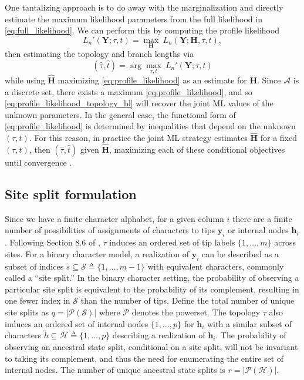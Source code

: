 \documentclass[a4paper]{article}
\newcommand{\alphabet}{\mathcal{A}}
\newcommand{\fullAlignment}{\mathbf{Y}}
\newcommand{\alignmentColumn}{\mathbf{y}}
\newcommand{\siteSplit}{\tilde{s}}
\newcommand{\siteSplitSet}{\mathcal{S}}
\newcommand{\fullAncestralStates}{\mathbf{H}}
\newcommand{\ancestralStateColumn}{\mathbf{h}}
\newcommand{\ancestralSplit}{\tilde{h}}
\newcommand{\ancestralSplitSet}{\mathcal{H}}
\newcommand{\nCols}{n}
\newcommand{\nSiteRows}{m}
\newcommand{\nAncestralStateRows}{p}
\newcommand{\nSiteSplits}{q}
\newcommand{\nAncestralSplits}{r}
\begin{document}
One tantalizing approach is to do away with the marginalization and directly estimate the maximum likelihood parameters from the full likelihood in \eqref{eq:full_likelihood}.
We can perform this by computing the profile likelihood
\begin{equation}
\label{eq:profile_likelihood}
L_\nCols'(\fullAlignment;\tau, t) = \max_{\fullAncestralStates} \ L_\nCols(\fullAlignment;\fullAncestralStates, \tau, t),
\end{equation}
then estimating the topology and branch lengths via
\begin{equation}
\label{eq:profile_likelihood_topology_bl}
(\hat{\tau}, \hat{t}) = \arg\max_{\tau, t} \ L_\nCols'(\fullAlignment;\tau, t)
\end{equation}
while using $\hat{\fullAncestralStates}$ maximizing \eqref{eq:profile_likelihood} as an estimate for $\fullAncestralStates$.
Since $\alphabet$ is a discrete set, there exists a maximum \eqref{eq:profile_likelihood}, and so \eqref{eq:profile_likelihood_topology_bl} will recover the joint ML values of the unknown parameters.
In the general case, the functional form of \eqref{eq:profile_likelihood} is determined by inequalities that depend on the unknown $(\tau,t)$.
For this reason, in practice the joint ML strategy estimates $\hat{\fullAncestralStates}$ for a fixed $(\tau,t)$, then $(\hat{\tau},\hat{t})$ given $\hat{\fullAncestralStates}$, maximizing each of these conditional objectives until convergence \cite{Neher2017}.

\subsection{Site split formulation}

Since we have a finite character alphabet, for a given column $i$ there are a finite number of possibilities of assignments of characters to tips $\alignmentColumn_i$ or internal nodes $\ancestralStateColumn_i$.
Following Section 8.6 of \cite{Semple2003-em}, $\tau$ induces an ordered set of tip labels $\{1,\ldots,\nSiteRows\}$ across sites.
For a binary character model, a realization of $\alignmentColumn_i$ can be described as a subset of indices $\siteSplit\subseteq\siteSplitSet\triangleq\{1,\ldots,\nSiteRows-1\}$ with equivalent characters, commonly called a ``site split.''
In the binary character setting, the probability of observing a particular site split is equivalent to the probability of its complement, resulting in one fewer index in $\siteSplitSet$ than the number of tips.
Define the total number of unique site splits as $\nSiteSplits=|\mathcal{P}(\siteSplitSet)|$ where $\mathcal{P}$ denotes the powerset.
The topology $\tau$ also induces an ordered set of internal nodes $\{1,\ldots,\nAncestralStateRows\}$ for $\ancestralStateColumn_i$ with a similar subset of characters $\ancestralSplit\subseteq\ancestralSplitSet\triangleq\{1,\ldots,\nAncestralStateRows\}$ describing a realization of $\ancestralStateColumn_i$.
The probability of observing an ancestral state split, conditional on a site split, will not be invariant to taking its complement, and thus the need for enumerating the entire set of internal nodes.
The number of unique ancestral state splits is $\nAncestralSplits=|\mathcal{P}(\ancestralSplitSet)|$.
\end{document}
